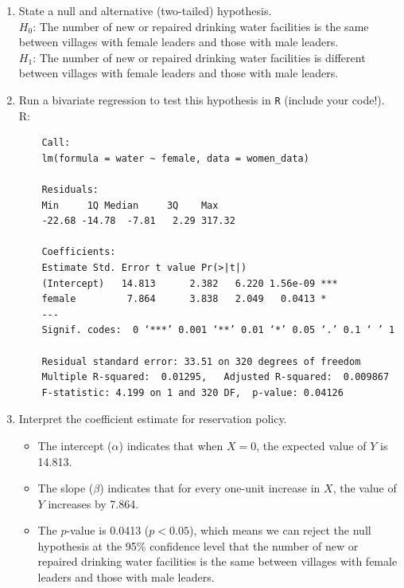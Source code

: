 \documentclass[12pt,letterpaper]{article}
\begin{document}
\newpage
\begin{enumerate}
	\item [(a)] State a null and alternative (two-tailed) hypothesis. \\
	
	$H_0$: The number of new or repaired drinking water facilities is the same between villages with female leaders and those with male leaders.\\
	
	$H_1$: The number of new or repaired drinking water facilities is different between villages with female leaders and those with male leaders.
	\vspace{2cm}
	\item [(b)] Run a bivariate regression to test this hypothesis in \texttt{R} (include your code!).\\
	R:
	
	\begin{verbatim}
	Call:
	lm(formula = water ~ female, data = women_data)
	
	Residuals:
	Min     1Q Median     3Q    Max 
	-22.68 -14.78  -7.81   2.29 317.32 
	
	Coefficients:
	Estimate Std. Error t value Pr(>|t|)    
	(Intercept)   14.813      2.382   6.220 1.56e-09 ***
	female         7.864      3.838   2.049   0.0413 *  
	---
	Signif. codes:  0 ‘***’ 0.001 ‘**’ 0.01 ‘*’ 0.05 ‘.’ 0.1 ‘ ’ 1
	
	Residual standard error: 33.51 on 320 degrees of freedom
	Multiple R-squared:  0.01295,	Adjusted R-squared:  0.009867 
	F-statistic: 4.199 on 1 and 320 DF,  p-value: 0.04126
	\end{verbatim}
	\vspace{6cm}
	\item [(c)] Interpret the coefficient estimate for reservation policy. \\
	\begin{itemize}
	\item The intercept ($\alpha$) indicates that when $X = 0$, the expected value of $Y$ is 14.813.
	\item The slope ($\beta$) indicates that for every one-unit increase in $X$, the value of $Y$ increases by 7.864.
	\item The $p$-value is 0.0413 ($p < 0.05$), which means we can reject the null hypothesis at the 95\% confidence level that the number of new or repaired drinking water facilities is the same between villages with female leaders and those with male leaders.
	\end{itemize}
\end{enumerate}


\end{document}
